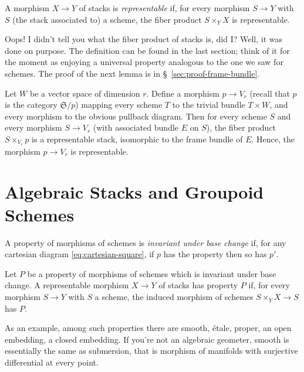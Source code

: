 \documentclass[12pt]{memoir}
\begin{document}
\begin{Def}\label{def:4.5}
A morphism $X \to Y$ of stacks is \emph{representable} if, for every morphism $S \to Y$ with $S$ (the stack associated to) a scheme, the fiber product $S \times_Y X$ is representable.
\end{Def}

Oops! I didn't tell you what the fiber product of stacks is, did I? Well, it was done on purpose. The definition can be found in the last section; think of it for the moment as enjoying a universal property analogous to the one we saw for schemes. The proof of the next lemma is in \S~\ref{sec:proof-frame-bundle}.

\begin{Lem}\label{lem:4.6}
Let $W$ be a vector space of dimension $r$. Define a morphism $p \to V_r$ (recall that $p$ is the category $\mathfrak{S}/p$) mapping every scheme $T$ to the trivial bundle $T \times W$, and every morphism to the obvious pullback diagram. Then for every scheme $S$ and every morphism $S \to V_r$ (with associated bundle $E$ on $S$), the fiber product $S \times_{V_r} p$ is a representable stack, isomorphic to the frame bundle of $E$. Hence, the morphism $p \to V_r$ is representable.
\end{Lem}

\section{Algebraic Stacks and Groupoid Schemes}

A property of morphisms of schemes is \emph{invariant under base change} if, for any cartesian diagram \eqref{eq:cartesian-square}, if $p$ has the property then so has $p'$.

\begin{Def}\label{def:5.1}
Let $P$ be a property of morphisms of schemes which is invariant under base change. A representable morphism $X \to Y$ of stacks has property $P$ if, for every morphism $S \to Y$ with $S$ a scheme, the induced morphism of schemes $S \times_Y X \to S$ has $P$.
\end{Def}


As an example, among such properties there are smooth, \'etale, proper, an open embedding, a closed embedding. If you're not an algebraic geometer, smooth is essentially the same as submersion, that is morphism of manifolds with surjective differential at every point.
\end{document}
